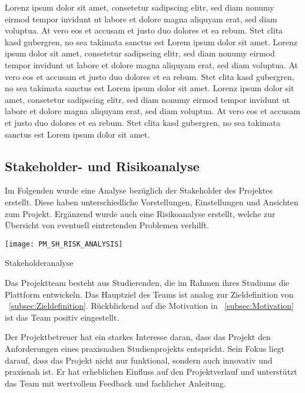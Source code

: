Lorenz ipsum dolor sit amet, consetetur sadipscing elitr, sed diam nonumy eirmod tempor invidunt ut labore et dolore magna aliquyam erat, sed diam voluptua.
At vero eos et accusam et justo duo dolores et ea rebum.
Stet clita kasd gubergren, no sea takimata sanctus est Lorem ipsum dolor sit amet.
Lorenz ipsum dolor sit amet, consetetur sadipscing elitr, sed diam nonumy eirmod tempor invidunt ut labore et dolore magna aliquyam erat, sed diam voluptua.
At vero eos et accusam et justo duo dolores et ea rebum.
Stet clita kasd gubergren, no sea takimata sanctus est Lorem ipsum dolor sit amet.
Lorenz ipsum dolor sit amet, consetetur sadipscing elitr, sed diam nonumy eirmod tempor invidunt ut labore et dolore magna aliquyam erat, sed diam voluptua.
At vero eos et accusam et justo duo dolores et ea rebum.
Stet clita kasd gubergren, no sea takimata sanctus est Lorem ipsum dolor sit amet.

\subsection{Stakeholder- und Risikoanalyse}\label{subsec:Stakeholder-Risikoanalyse}
Im Folgenden wurde eine Analyse bezüglich der Stakeholder des Projektes erstellt.
Diese haben unterschiedliche Vorstellungen, Einstellungen und Ansichten zum Projekt.
Ergänzend wurde auch eine Risikoanalyse erstellt, welche zur Übersicht von eventuell eintretenden Problemen verhilft. \par
\newpage %


\begin{table}[h!]
    \centering
    \texttt{[image: PM\_SH\_RISK\_ANALYSIS]}
    \caption{Stakeholderanalyse}
\end{table}

Das Projektteam besteht aus Studierenden, die im Rahmen ihres Studiums die Plattform entwickeln.
Das Hauptziel des Teams ist analog zur Zieldefinition von ~\ref{subsec:Zieldefinition}.
Rückblickend auf die Motivation in ~\ref{subsec:Motivation} ist das Team positiv eingestellt. \par

Der Projektbetreuer hat ein starkes Interesse daran, dass das Projekt den Anforderungen eines praxisnahen Studienprojekts entspricht.
Sein Fokus liegt darauf, dass das Projekt nicht nur funktional, sondern auch innovativ und praxisnah ist.
Er hat erheblichen Einfluss auf den Projektverlauf und unterstützt das Team mit wertvollem Feedback und fachlicher Anleitung. \par

